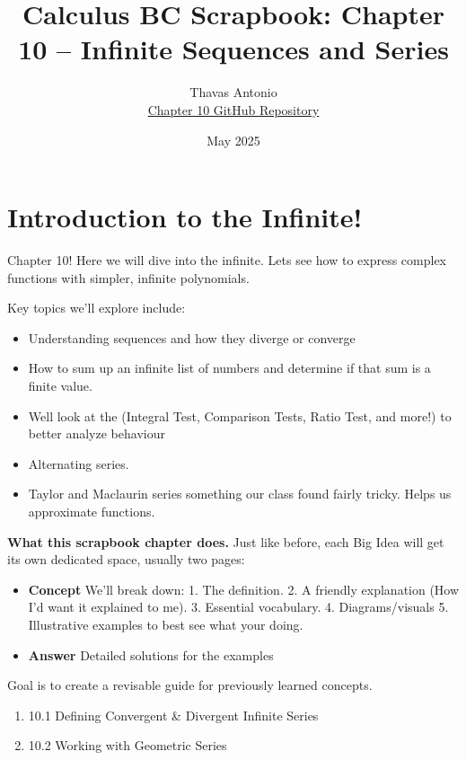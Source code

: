 \documentclass{article}
\title{\textbf{Calculus BC Scrapbook: Chapter 10 – Infinite Sequences and Series}}
\author{
  Thavas Antonio\\
  \small\href{https://github.com/BuddyBob/Chapter10}{Chapter 10 GitHub Repository}
}
\date{May 2025}
\begin{document}
\maketitle
\tableofcontents
\newpage

\section{Introduction to the Infinite!}

Chapter 10! Here we will dive into the infinite. Lets see how to express complex functions with simpler, infinite polynomials.

Key topics we'll explore include:
\begin{itemize}
    \item Understanding sequences and how they diverge or converge
    \item How to sum up an infinite list of numbers and determine if that sum is a finite value.
    \item Well look at the (Integral Test, Comparison Tests, Ratio Test, and more!) to better analyze behaviour
    \item Alternating series.
    \item Taylor and Maclaurin series something our class found fairly tricky. Helps us approximate functions.
\end{itemize}

\medskip
\noindent
\textbf{What this scrapbook chapter does.} Just like before, each Big Idea will get its own dedicated space, usually two pages:

\begin{itemize}
  \item \textbf{Concept} We'll break down: 1. The definition. 2. A friendly explanation (How I'd want it explained to me). 3. Essential vocabulary. 4. Diagrams/visuals 5. Illustrative examples to best see what your doing.
  \item \textbf{Answer} Detailed solutions for the examples
\end{itemize}

Goal is to create a revisable guide for previously learned concepts.

\vspace{10pt}


\begin{tcolorbox}[title=Chapter 10 Road-Map: All 15 Infinite-Series Big Ideas,
                  colback=gray!8, colframe=purple!70!black]

\begin{enumerate}[itemsep=3pt, topsep=2pt]
  \item 10.1  Defining Convergent \& Divergent Infinite Series
  \item 10.2  Working with Geometric Series
\end{enumerate}

\end{tcolorbox}
\newpage
\end{document}
